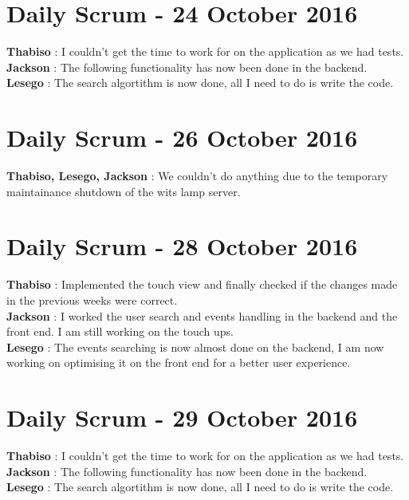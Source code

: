 \documentclass[10pt,a4paper]{article}
\begin{document}
\section{Daily Scrum - 24 October 2016}
\textbf{Thabiso} : I couldn't get the time to work for on the application as we had tests.\\

\textbf{Jackson} : The following functionality has now been done in the backend.\\

\textbf{Lesego} : The search algortithm is now done, all I need to do is write the code.\\
\section{Daily Scrum - 26 October 2016}
\textbf{Thabiso, Lesego, Jackson} : We couldn't do anything due to the temporary maintainance shutdown of the wits lamp server.\\

\section{Daily Scrum - 28 October 2016}
\textbf{Thabiso} : Implemented the touch view and finally checked if the changes made in the previous weeks were correct.\\

\textbf{Jackson} : I worked the user search and events handling in the backend and the front end. I am  still working on the touch ups.\\

\textbf{Lesego} : The events searching is now almost done on the backend, I am now working on optimising it on the front end for a better 
user experience.\\

\section{Daily Scrum - 29 October 2016}
\textbf{Thabiso} : I couldn't get the time to work for on the application as we had tests.\\

\textbf{Jackson} : The following functionality has now been done in the backend.\\

\textbf{Lesego} : The search algortithm is now done, all I need to do is write the code.\\
\end{document}
